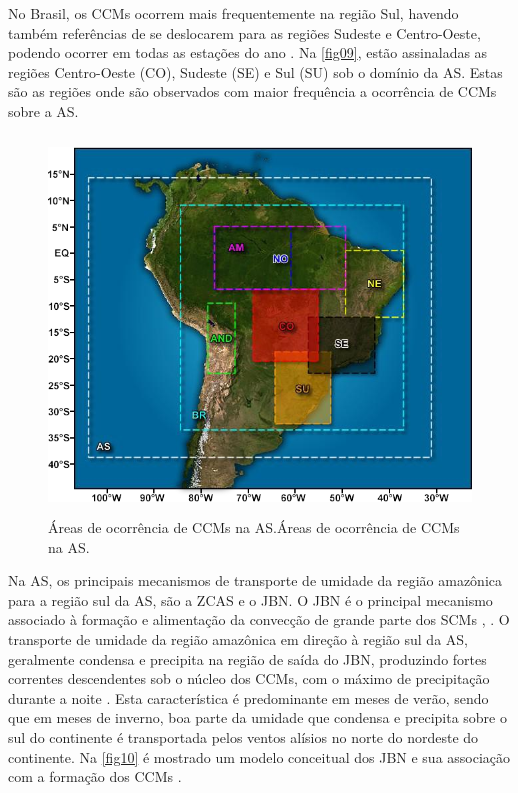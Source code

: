 No Brasil, os CCMs ocorrem mais frequentemente na região Sul, havendo também referências de se deslocarem para as regiões Sudeste e Centro-Oeste, podendo ocorrer em todas as estações do ano \cite{silvadias96}. Na \autoref{fig09}, estão assinaladas as regiões Centro-Oeste (CO), Sudeste (SE) e Sul (SU) sob o domínio da AS. Estas são as regiões onde são observados com maior frequência a ocorrência de CCMs sobre a AS.

\begin{figure}
\centering
\includegraphics[height=10cm]{./figs/fig09.png}
\caption{Áreas de ocorrência de CCMs na AS.Áreas de ocorrência de CCMs na AS.}
\label{fig09}
\end{figure}

Na AS, os principais mecanismos de transporte de umidade da região amazônica para a região sul da AS, são a ZCAS e o JBN. O JBN é o principal mecanismo associado à formação e alimentação da convecção de grande parte dos SCMs \cite{ferreiraetal03}, \cite{herdiesetal02}. O transporte de umidade da região amazônica em direção à região sul da AS, geralmente condensa e precipita na região de saída do JBN, produzindo fortes correntes descendentes sob o núcleo dos CCMs, com o máximo de precipitação durante a noite \cite{noguespaegleberbery00}. Esta característica é predominante em meses de verão, sendo que em meses de inverno, boa parte da umidade que condensa e precipita sobre o sul do continente é transportada pelos ventos alísios no norte do nordeste do continente. Na \autoref{fig10} é mostrado um modelo conceitual dos JBN e sua associação com a formação dos CCMs \cite{marengoetal04}.

